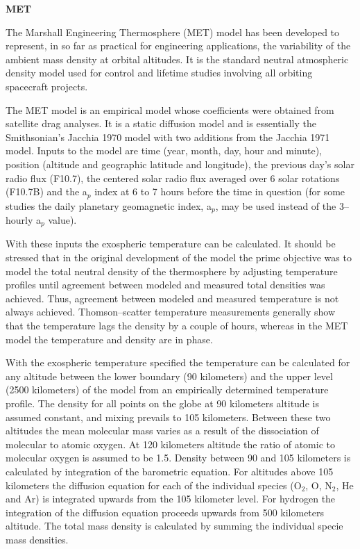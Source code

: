\textbf{MET}

The Marshall Engineering Thermosphere (MET) model has been developed to
represent, in so far as practical for engineering applications, the
variability of the ambient mass density at orbital altitudes.  It is the
standard neutral atmospheric density model used for control and lifetime
studies involving all orbiting spacecraft projects.

The MET model is an empirical model whose coefficients were obtained from
satellite drag analyses.  It is a static diffusion model and is essentially
the Smithsonian's Jacchia 1970 model with two additions from the Jacchia
1971 model. Inputs to the model are time (year, month, day, hour and
minute), position (altitude and geographic latitude and longitude), the
previous day's solar radio flux (F10.7), the centered solar radio flux
averaged over 6 solar rotations (F10.7B) and the a$_{p}$ index at 6 to 7 hours
before the time in question (for some studies the daily planetary
geomagnetic index, a$_{p}$, may be used instead of the 3--hourly a$_{p}$ value).

With these inputs the exospheric temperature can be calculated.  It should be
stressed that in the original development of the model the prime objective
was to model the total neutral density of the thermosphere by adjusting
temperature profiles until agreement between modeled and measured total
densities was achieved.  Thus, agreement between modeled and measured
temperature is not always achieved.  Thomson--scatter temperature
measurements generally show that the temperature lags the density by a
couple of hours, whereas in the MET model the temperature and density are in
phase.

With the exospheric temperature specified the temperature can be calculated
for any altitude between the lower boundary (90 kilometers) and the upper
level (2500 kilometers) of the model from an empirically determined
temperature profile.  The density for all points on the globe at 90
kilometers altitude is assumed constant, and mixing prevails to 105
kilometers. Between these two altitudes the mean molecular mass varies as a
result of the dissociation of molecular to atomic oxygen.  At 120 kilometers
altitude the ratio of atomic to molecular oxygen is assumed to be 1.5.
Density between 90 and 105 kilometers is calculated by integration of the
barometric equation.  For altitudes above 105 kilometers the diffusion
equation for each of the individual species (O$_{2}$, O, N$_{2}$, He and Ar)
is integrated upwards from the 105 kilometer level.  For hydrogen the
integration of the diffusion equation proceeds upwards from 500 kilometers
altitude.  The total mass density is calculated by summing the individual
specie mass densities.

